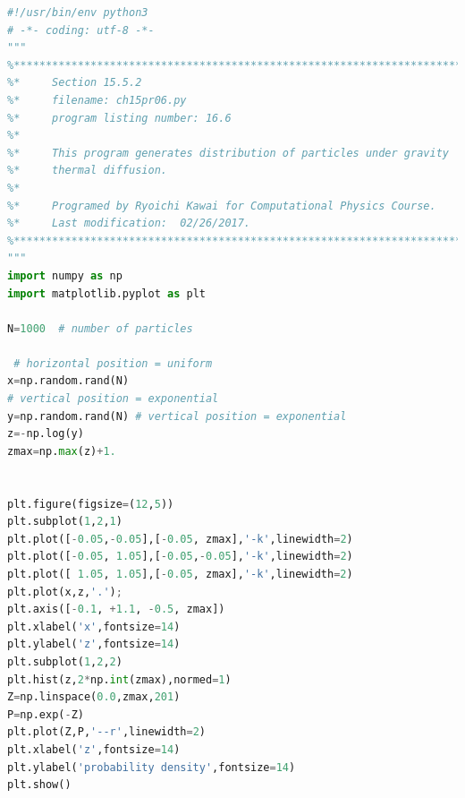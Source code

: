 \bigskip
\noindent
\program
\footnotesize
\begin{lstlisting}[language=python]
#!/usr/bin/env python3
# -*- coding: utf-8 -*-
"""
%**************************************************************************
%*     Section 15.5.2                                                     *
%*     filename: ch15pr06.py                                              *
%*     program listing number: 16.6                                       *
%*                                                                        *
%*     This program generates distribution of particles under gravity     *
%*     thermal diffusion.
%*                                                                        *
%*     Programed by Ryoichi Kawai for Computational Physics Course.       *
%*     Last modification:  02/26/2017.                                    *
%**************************************************************************
"""
import numpy as np
import matplotlib.pyplot as plt

N=1000  # number of particles

 # horizontal position = uniform
x=np.random.rand(N)
# vertical position = exponential
y=np.random.rand(N) # vertical position = exponential
z=-np.log(y)
zmax=np.max(z)+1.


plt.figure(figsize=(12,5))
plt.subplot(1,2,1)
plt.plot([-0.05,-0.05],[-0.05, zmax],'-k',linewidth=2)
plt.plot([-0.05, 1.05],[-0.05,-0.05],'-k',linewidth=2)
plt.plot([ 1.05, 1.05],[-0.05, zmax],'-k',linewidth=2)
plt.plot(x,z,'.');
plt.axis([-0.1, +1.1, -0.5, zmax])
plt.xlabel('x',fontsize=14)
plt.ylabel('z',fontsize=14)
plt.subplot(1,2,2)
plt.hist(z,2*np.int(zmax),normed=1)
Z=np.linspace(0.0,zmax,201)
P=np.exp(-Z)
plt.plot(Z,P,'--r',linewidth=2)
plt.xlabel('z',fontsize=14)
plt.ylabel('probability density',fontsize=14)
plt.show()
\end{lstlisting}
\normalsize

